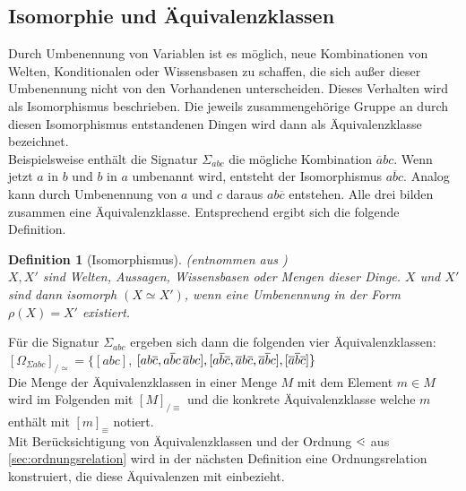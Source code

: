 \documentclass[12pt,a4paper]{article}
\newtheorem{theorem}{Definition}
\newcommand\dotl{\mathrel{%
    \mathchoice{\QEQ}{\QEQ}{\QEQ}{\QEQ}%
}}
\def\QEQ{{%
    \setbox0\hbox{<}%
    \rlap{\hbox to \wd0{\hss \raisebox {0.1pt}{$\ \cdot$\hss}}}\box0
}}
\begin{document}
\subsection{Isomorphie und Äquivalenzklassen}
\label{sec:äquivalenz-wissensbasen}
Durch Umbenennung von Variablen ist es möglich, neue Kombinationen von Welten, Konditionalen oder Wissensbasen zu schaffen, die sich außer dieser Umbenennung nicht von den Vorhandenen unterscheiden. Dieses Verhalten wird als Isomorphismus beschrieben. Die jeweils zusammengehörige Gruppe an durch diesen Isomorphismus entstandenen Dingen wird dann als Äquivalenzklasse bezeichnet.\\
Beispielsweise enthält die Signatur $\Sigma_{abc}$ die mögliche Kombination $\overline{a}bc$. Wenn jetzt $a$ in $b$ und $b$ in $a$ umbenannt wird, entsteht der Isomorphismus $a\overline{b}c$. Analog kann durch Umbenennung von $a$ und $c$ daraus $ab\overline{c}$ entstehen. Alle drei bilden zusammen eine Äquivalenzklasse. Entsprechend ergibt sich die folgende Definition.
\begin{theorem}[Isomorphismus](entnommen aus \cite{beierle19}) \ \\
$X, X'$ sind Welten, Aussagen, Wissensbasen oder Mengen dieser Dinge. $X$ und $X'$ sind dann isomorph $(X \simeq X')$, wenn eine Umbenennung in der Form $\rho(X) = X'$ existiert.
\end{theorem}
Für die Signatur $\Sigma_{abc}$ ergeben sich dann die folgenden vier Äquivalenzklassen: \\
$[\Omega_{\Sigma abc}]_{/\simeq}=\{[abc]$, $[ab\overline{c}, a\overline{b}c\, \overline{a}bc], [a\overline{b}\overline{c}, \overline{a\\}b\overline{c}, \overline{a}\overline{b}c], [\overline{a}\overline{b}\overline{c}]\}$ \\
Die Menge der Äquivalenzklassen in einer Menge $M$ mit dem Element $m \in M$ wird im Folgenden mit $[M]_{/\equiv}$ und die konkrete Äquivalenzklasse welche $m$ enthält mit $[m]_\equiv$ notiert.\\
Mit Berücksichtigung von Äquivalenzklassen und der Ordnung $\dotl$ aus \autoref{sec:ordnungsrelation} wird in der nächsten Definition eine Ordnungsrelation konstruiert, die diese Äquivalenzen mit einbezieht.
\end{document}
